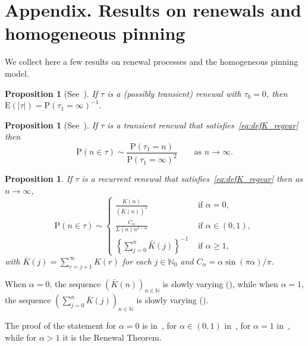 \documentclass[11pt]{article}
\newtheorem{prop}[theo]{Proposition}
\theoremstyle{definition}
\numberwithin{equation}{section}
\numberwithin{figure}{section}
\numberwithin{table}{section}
\newcommand{\bbN}{{\ensuremath{\mathbb N}}}
\newcommand{\ga}{\alpha}
\newcommand\bP{\ensuremath{\mathrm{P}}}
\newcommand\bE{\ensuremath{\mathrm{E}}}
\newcommand*{\MK}{\mkern 2mu}
\begin{document}
\section*{Appendix. Results on renewals and homogeneous pinning} \label{Facts}
\setcounter{section}{1}
\setcounter{equation}{0}
\setcounter{cdrthm}{0}

We collect here a few results on renewal processes and the homogeneous pinning model.

\begin{prop}[{See~\cite[Proposition~2.4, Chapter~I]{A2003}}] \label{meanReturns}
If $\tau$ is a (possibly transient) renewal with $\tau_0 = 0$, then $\bE(|\tau|) = \bP(\tau_1 = \infty)^{-1}$.
\end{prop}

\begin{prop}[{See~\cite[Theorem~A.4, Appendix~A.5.2]{Gi2007}}]
If $\tau$ is a transient renewal that satisfies~\eqref{eq:defK_regvar} then
\begin{equation}
\bP(n \in \tau) \sim \frac{\bP(\tau_1 = n)}{\bP(\tau_1 = \infty)^2} \qquad \text{as } n \to \infty.
\end{equation}
\end{prop}

\begin{prop}\label{RMassFunctionProp}
If $\tau$ is a recurrent renewal that satisfies~\eqref{eq:defK_regvar} then as $n \to \infty$,
\begin{equation}\label{RMassFunction}
\bP(n \in \tau) \sim
\begin{cases}
\frac{K(n)}{(\bar K(n))^2} & \text{ if } \ga = 0,\\[4pt]
\frac{C_\ga}{L(n) n^{1 - \ga}} & \text{ if } \ga \in (0,1),\\[4pt]
\left\{ \sum_{j=0}^n \bar K(j) \right\}^{-1} & \text{ if } \ga \geq 1,
\end{cases}
\end{equation}
with $\bar K(j) = \sum_{r=j+1}^\infty K(r)$ for each $j\in\bbN_0$ and $C_\ga = \ga \sin(\pi \ga)/\pi$.
\end{prop}

When $\ga = 0$, the sequence $(\bar K(n))_{n\in\bbN}$ is slowly varying (\cite[Propos-\linebreak ition~1.5.9$\MK$(b)]{BGT89}), while when $\ga = 1$, the sequence $(\sum_{j=0}^ n \bar K(j))_{n\in\bbN}$ is slowly varying (\cite[Prop\-os\-itions~1.5.10 and~1.5.9$\MK$(a)]{BGT89}).

The proof of the statement for $\ga = 0$ is in~\cite[Theorem~1.1]{Na2012}, for $\ga \in (0,1)$ in~\cite[Theorem~1.1]{GL63}, for $\ga = 1$ in~\cite[Theorem~8.7.5]{BGT89}, while for $\ga > 1$ it is the Renewal Theorem.
\end{document}
